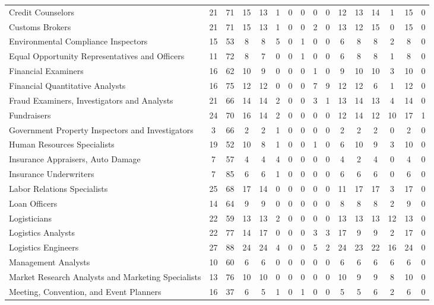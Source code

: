 \begin{sidewaystable}
{\begin{threeparttable}[t]
\begin{tabular}{lcc|ccccccccccccc}
Credit Counselors & 21 & 71 & 15 & 13 & 1 & 0 & 0 & 0 & 0 & 12 & 13 & 14 & 1 & 15 & 0 \\
Customs Brokers & 21 & 71 & 15 & 13 & 1 & 0 & 0 & 2 & 0 & 13 & 12 & 15 & 0 & 15 & 0 \\
Environmental Compliance Inspectors & 15 & 53 & 8 & 8 & 5 & 0 & 1 & 0 & 0 & 6 & 8 & 8 & 2 & 8 & 0 \\
Equal Opportunity Representatives and Officers & 11 & 72 & 8 & 7 & 0 & 0 & 1 & 0 & 0 & 6 & 8 & 8 & 1 & 8 & 0 \\
Financial Examiners & 16 & 62 & 10 & 9 & 0 & 0 & 0 & 1 & 0 & 9 & 10 & 10 & 3 & 10 & 0 \\
Financial Quantitative Analysts & 16 & 75 & 12 & 12 & 0 & 0 & 0 & 7 & 9 & 12 & 12 & 6 & 1 & 12 & 0 \\
Fraud Examiners, Investigators and Analysts & 21 & 66 & 14 & 14 & 2 & 0 & 0 & 3 & 1 & 13 & 14 & 13 & 4 & 14 & 0 \\
Fundraisers & 24 & 70 & 16 & 14 & 2 & 0 & 0 & 0 & 0 & 12 & 14 & 12 & 10 & 17 & 1 \\
Government Property Inspectors and Investigators & 3 & 66 & 2 & 2 & 1 & 0 & 0 & 0 & 0 & 2 & 2 & 2 & 0 & 2 & 0 \\
Human Resources Specialists & 19 & 52 & 10 & 8 & 1 & 0 & 0 & 1 & 0 & 6 & 10 & 9 & 3 & 10 & 0 \\
Insurance Appraisers, Auto Damage & 7 & 57 & 4 & 4 & 4 & 0 & 0 & 0 & 0 & 4 & 2 & 4 & 0 & 4 & 0 \\
Insurance Underwriters & 7 & 85 & 6 & 6 & 1 & 0 & 0 & 0 & 0 & 6 & 6 & 6 & 0 & 6 & 0 \\
Labor Relations Specialists & 25 & 68 & 17 & 14 & 0 & 0 & 0 & 0 & 0 & 11 & 17 & 17 & 3 & 17 & 0 \\
Loan Officers & 14 & 64 & 9 & 9 & 0 & 0 & 0 & 0 & 0 & 8 & 8 & 8 & 2 & 9 & 0 \\
Logisticians & 22 & 59 & 13 & 13 & 2 & 0 & 0 & 0 & 0 & 13 & 13 & 13 & 12 & 13 & 0 \\
Logistics Analysts & 22 & 77 & 14 & 17 & 0 & 0 & 0 & 3 & 3 & 17 & 9 & 9 & 2 & 17 & 0 \\
Logistics Engineers & 27 & 88 & 24 & 24 & 4 & 0 & 0 & 5 & 2 & 24 & 23 & 22 & 16 & 24 & 0 \\
Management Analysts & 10 & 60 & 6 & 6 & 0 & 0 & 0 & 0 & 0 & 6 & 6 & 6 & 6 & 6 & 0 \\
Market Research Analysts and Marketing Specialists & 13 & 76 & 10 & 10 & 0 & 0 & 0 & 0 & 0 & 10 & 9 & 9 & 8 & 10 & 0 \\
Meeting, Convention, and Event Planners & 16 & 37 & 6 & 5 & 1 & 0 & 1 & 0 & 0 & 5 & 5 & 6 & 2 & 6 & 0 \\

\end{tabular}
\end{threeparttable}}
\end{sidewaystable}
